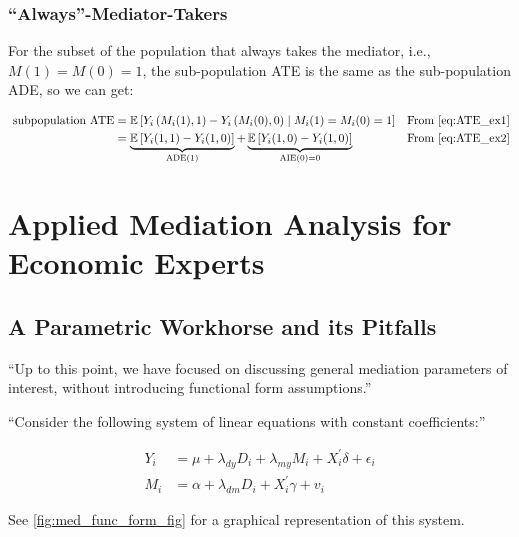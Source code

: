 \documentclass[10pt]{article}
\begin{document}
\subsubsection{``Always''-Mediator-Takers}

For the subset of the population that always takes the mediator,
i.e., $M(1)=M(0)=1$, the sub-population ATE is the same as the 
sub-population ADE, so we can get:

\begin{align}
    \text { subpopulation ATE} & =\mathbb{E}\left[Y_i\left(M_i(1), 1\right)-Y_i\left(M_i(0), 0\right) \mid M_i(1)=M_i(0)=1\right] && \text{From } \eqref{eq:ATE_ex1} \\
    & =\underbrace{\mathbb{E}\left[Y_i(1,1)-Y_i(1,0)\right]}_{\text{ADE}(1)}+\underbrace{\mathbb{E}\left[Y_i(1,0)-Y_i(1,0)\right]}_{\text{AIE}(0)=0} && \text{From } \eqref{eq:ATE_ex2} \\
\end{align}



\section{Applied Mediation Analysis for Economic Experts}

\subsection{A Parametric Workhorse and its Pitfalls}

``Up to this point, we have focused on discussing general mediation 
parameters of interest, without introducing functional form assumptions.''

``Consider the following system of linear 
equations with constant coefficients:''

\begin{align}
    Y_i & =\mu+\lambda_{d y} D_i+\lambda_{m y} M_i+X_i^{\prime} \delta+\epsilon_i \\
    M_i & =\alpha+\lambda_{d m} D_i+X_i^{\prime} \gamma+v_i
\end{align}

See \autoref{fig:med_func_form_fig}
for a graphical representation of this system.
\end{document}
